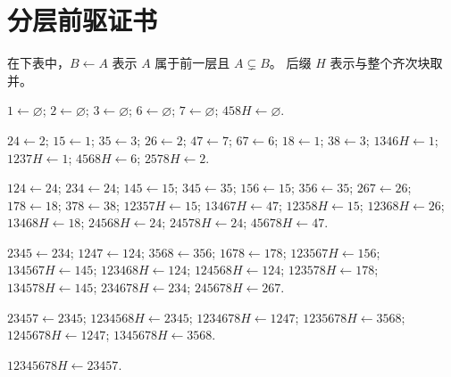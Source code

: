 \documentclass[UTF8,11pt,a4paper,fontset=fandol]{ctexart}
\theoremstyle{definition}
\theoremstyle{remark}
\begin{document}
\section{分层前驱证书}
\label{app:layering}

在下表中，$B\leftarrow A$ 表示 $A$ 属于前一层且 $A\subsetneq B$。
后缀 $H$ 表示与整个齐次块取并。

\begin{description}[leftmargin=1.8em,style=nextline]
\item[$\mathcal A_1\leftarrow\mathcal A_0$]
$1\leftarrow\varnothing$;
$2\leftarrow\varnothing$;
$3\leftarrow\varnothing$;
$6\leftarrow\varnothing$;
$7\leftarrow\varnothing$;
$458H\leftarrow\varnothing$.

\item[$\mathcal A_2\leftarrow\mathcal A_1$]
$24\leftarrow2$; $15\leftarrow1$; $35\leftarrow3$;
$26\leftarrow2$; $47\leftarrow7$; $67\leftarrow6$;
$18\leftarrow1$; $38\leftarrow3$; $1346H\leftarrow1$;
$1237H\leftarrow1$; $4568H\leftarrow6$; $2578H\leftarrow2$.

\item[$\mathcal A_3\leftarrow\mathcal A_2$]
$124\leftarrow24$; $234\leftarrow24$; $145\leftarrow15$;
$345\leftarrow35$; $156\leftarrow15$; $356\leftarrow35$;
$267\leftarrow26$; $178\leftarrow18$; $378\leftarrow38$;
$12357H\leftarrow15$; $13467H\leftarrow47$;
$12358H\leftarrow15$; $12368H\leftarrow26$;
$13468H\leftarrow18$; $24568H\leftarrow24$;
$24578H\leftarrow24$; $45678H\leftarrow47$.

\item[$\mathcal A_4\leftarrow\mathcal A_3$]
$2345\leftarrow234$; $1247\leftarrow124$;
$3568\leftarrow356$; $1678\leftarrow178$;
$123567H\leftarrow156$; $134567H\leftarrow145$;
$123468H\leftarrow124$; $124568H\leftarrow124$;
$123578H\leftarrow178$; $134578H\leftarrow145$;
$234678H\leftarrow234$; $245678H\leftarrow267$.

\item[$\mathcal A_5\leftarrow\mathcal A_4$]
$23457\leftarrow2345$; $1234568H\leftarrow2345$;
$1234678H\leftarrow1247$; $1235678H\leftarrow3568$;
$1245678H\leftarrow1247$; $1345678H\leftarrow3568$.

\item[$\mathcal A_6\leftarrow\mathcal A_5$]
$12345678H\leftarrow23457$.
\end{description}

{}
{\small


}
\end{document}
